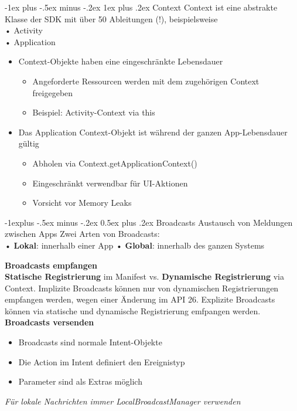 \documentclass[10pt,landscape,a4paper]{article}
\makeatletter
\renewcommand{\subsection}{\@startsection{subsection}{2}{0mm}%
                                {-1explus -.5ex minus -.2ex}%
                                {0.5ex plus .2ex}%
                                {\normalfont\small\bfseries}}
\renewcommand{\subsubsection}{\@startsection{subsubsection}{3}{0mm}%
                                {-1ex plus -.5ex minus -.2ex}%
                                {1ex plus .2ex}%
                                {\normalfont\footnotesize\bfseries}}
\makeatother
\begin{document}
\begin{multicols*}{3}
\subsubsection{Context}
Context ist eine abstrakte Klasse der SDK
mit über 50 Ableitungen (!), beispielsweise\\
• Activity\\
• Application
\begin{itemize}[leftmargin=*]
\item{Context-Objekte haben eine eingeschränkte Lebensdauer}
\begin{itemize}[leftmargin=*]
\item{Angeforderte Ressourcen werden mit dem zugehörigen Context freigegeben}
\item{Beispiel: Activity-Context via this}
\end{itemize}
\item{Das Application Context-Objekt ist während der ganzen App-Lebensdauer gültig}
\begin{itemize}[leftmargin=*]
\item{Abholen via Context.getApplicationContext()}
\item{Eingeschränkt verwendbar für UI-Aktionen}
\item{Vorsicht vor Memory Leaks}
\end{itemize}
\end{itemize}

\subsection{Broadcasts}
Austausch von Meldungen zwischen Apps
Zwei Arten von Broadcasts:\\
• \textbf{Lokal}: innerhalb einer App
• \textbf{Global}: innerhalb des ganzen Systems

\textbf{Broadcasts empfangen}\\
\textbf{Statische Registrierung} im Manifest vs. \textbf{Dynamische Registrierung} via Context. 
Implizite Broadcasts können nur von dynamischen Registrierungen empfangen werden, wegen einer Änderung im API 26. Explizite Broadcasts können via statische und dynamische Registrierung emfpangen werden.\\
\textbf{Broadcasts versenden}
\begin{itemize}[leftmargin=*]
\item{Broadcasts sind normale Intent-Objekte}
\item{Die Action im Intent definiert den Ereignistyp}
\item{Parameter sind als Extras möglich}
\end{itemize}
\textit{Für lokale Nachrichten immer LocalBroadcastManager verwenden}

\end{multicols*}
\end{document}
